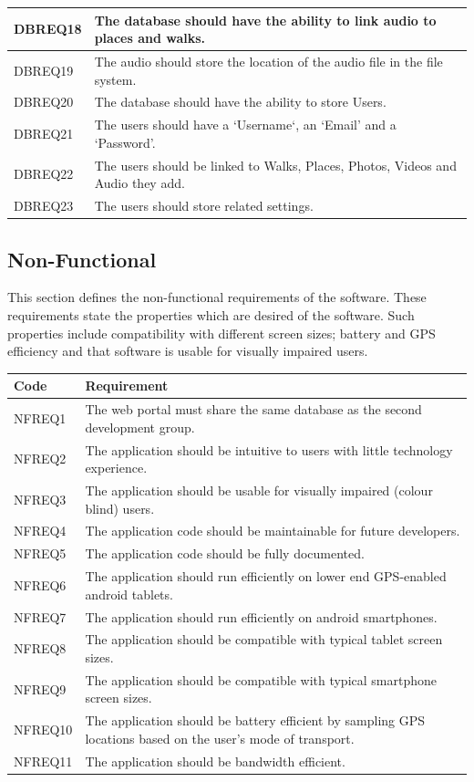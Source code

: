 \documentclass[11pt,a4paper]{article}
\begin{document}
\begin{longtable}{|p{2.5cm}p{13cm}|}
DBREQ18 & The database should have the ability to link audio to places and walks.\\ \hline
DBREQ19 & The audio should store the location of the audio file in the file system.\\ \hline
DBREQ20 & The database should have the ability to store Users. \\ \hline
DBREQ21 & The users should have a `Username`, an `Email' and a `Password'.\\ \hline
DBREQ22 & The users should be linked to Walks, Places, Photos, Videos and Audio they add. \\ \hline
DBREQ23 & The users should store related settings. \\ \hline 

\end{longtable}

\subsection{Non-Functional}
\label{sec:non-func-reqs}

This section defines the non-functional requirements of the software.
These requirements state the properties which are desired of the software.
Such properties include compatibility with different screen sizes; battery and GPS efficiency and that software is usable for visually impaired users.

\begin{longtable}{|p{2.5cm}p{13cm}|}
\hline
\textbf{Code} & \textbf{Requirement} \\

\hline
NFREQ1 & The web portal must share the same database as the second development group. \\ \hline
NFREQ2 & The application should be intuitive to users with little technology experience. \\ \hline
NFREQ3 & The application should be usable for visually impaired (colour blind) users. \\ \hline
NFREQ4 & The application code should be maintainable for future developers. \\ \hline
NFREQ5 & The application code should be fully documented. \\ \hline
NFREQ6 & The application should run efficiently on lower end GPS-enabled android tablets. \\ \hline
NFREQ7 & The application should run efficiently on android smartphones. \\ \hline
NFREQ8 & The application should be compatible with typical tablet screen sizes. \\ \hline
NFREQ9 & The application should be compatible with typical smartphone screen sizes. \\ \hline
NFREQ10 & The application should be battery efficient by sampling GPS locations based on the user's mode of transport. \\ \hline
NFREQ11 & The application should be bandwidth efficient. \\ \hline
\end{longtable}
\end{document}
